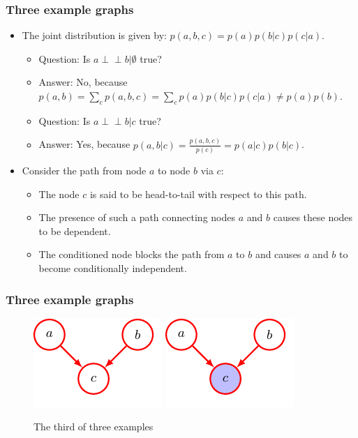 \documentclass{beamer}
\newcommand{\ind}{\perp\!\!\!\!\perp}
\begin{document}
\begin{frame}
    \frametitle{Three example graphs}
    \begin{itemize}
        \item The joint distribution is given by: $p(a,b,c)=p(a)p(b|c)p(c|a)$.
        \begin{itemize}
            \item Question: Is $a\ind{}b|\emptyset$ true?
            \item Answer: No, because $p(a,b)=\sum_{c}p(a,b,c)=\sum_{c}p(a)p(b|c)p(c|a)\ne{}p(a)p(b)$.
            \item Question: Is $a\ind{}b|c$ true?
            \item Answer: Yes, because $p(a,b|c)=\frac{p(a,b,c)}{p(c)}=p(a|c)p(b|c)$.
        \end{itemize}
        \item Consider the path from node $a$ to node $b$ via $c$:
        \begin{itemize}
            \item The node $c$ is said to be head-to-tail with respect to this path.
            \item The presence of such a path connecting nodes $a$ and $b$ causes these nodes to be dependent.
            \item The conditioned node blocks the path from $a$ to $b$ and causes $a$ and $b$ to become conditionally independent.
        \end{itemize}
    \end{itemize}
\end{frame}

\begin{frame}
    \frametitle{Three example graphs}
    \begin{figure}
        \caption{The third of three examples}
        \includegraphics[trim=0 0 -1cm 0]{Figure_18.pdf}
        \includegraphics[trim=-1cm 0 0 0]{Figure_19.pdf}
    \end{figure}
\end{frame}
\end{document}
